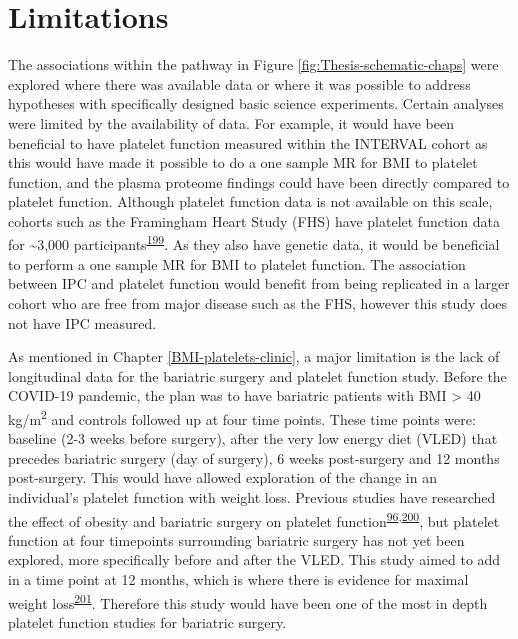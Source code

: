 \documentclass[11pt,twoside]{bristolthesis}
\begin{document}
\hypertarget{limitations}{%
\section{Limitations}\label{limitations}}

The associations within the pathway in Figure \ref{fig:Thesis-schematic-chaps} were explored where there was available data or where it was possible to address hypotheses with specifically designed basic science experiments. Certain analyses were limited by the availability of data. For example, it would have been beneficial to have platelet function measured within the INTERVAL cohort as this would have made it possible to do a one sample MR for BMI to platelet function, and the plasma proteome findings could have been directly compared to platelet function. Although platelet function data is not available on this scale, cohorts such as the Framingham Heart Study (FHS) have platelet function data for \textasciitilde3,000 participants\textsuperscript{\protect\hyperlink{ref-Rodriguez2020}{199}}. As they also have genetic data, it would be beneficial to perform a one sample MR for BMI to platelet function. The association between IPC and platelet function would benefit from being replicated in a larger cohort who are free from major disease such as the FHS, however this study does not have IPC measured.

As mentioned in Chapter \ref{BMI-platelets-clinic}, a major limitation is the lack of longitudinal data for the bariatric surgery and platelet function study. Before the COVID-19 pandemic, the plan was to have bariatric patients with BMI \textgreater{} 40 kg/m\textsuperscript{2} and controls followed up at four time points. These time points were: baseline (2-3 weeks before surgery), after the very low energy diet (VLED) that precedes bariatric surgery (day of surgery), 6 weeks post-surgery and 12 months post-surgery. This would have allowed exploration of the change in an individual's platelet function with weight loss. Previous studies have researched the effect of obesity and bariatric surgery on platelet function\textsuperscript{\protect\hyperlink{ref-Barrachina2019}{96},\protect\hyperlink{ref-Dobrydneva2012}{200}}, but platelet function at four timepoints surrounding bariatric surgery has not yet been explored, more specifically before and after the VLED. This study aimed to add in a time point at 12 months, which is where there is evidence for maximal weight loss\textsuperscript{\protect\hyperlink{ref-Maciejewski2016}{201}}. Therefore this study would have been one of the most in depth platelet function studies for bariatric surgery.
\end{document}

